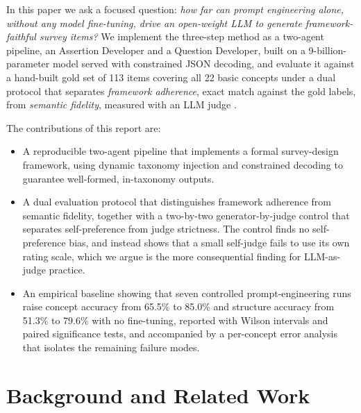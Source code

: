 \documentclass[onecolumn, 11pt]{IEEEtran}
\begin{document}
In this paper we ask a focused question: \emph{how far can prompt engineering alone, without any model fine-tuning, drive an open-weight LLM to generate framework-faithful survey items?} We implement the three-step method as a two-agent pipeline, an Assertion Developer and a Question Developer, built on a 9-billion-parameter model served with constrained JSON decoding, and evaluate it against a hand-built gold set of 113 items covering all 22 basic concepts under a dual protocol that separates \emph{framework adherence}, exact match against the gold labels, from \emph{semantic fidelity}, measured with an LLM judge \cite{zheng2023judging}.

The contributions of this report are:
\begin{itemize}
\item A reproducible two-agent pipeline that implements a formal survey-design framework, using dynamic taxonomy injection and constrained decoding to guarantee well-formed, in-taxonomy outputs.
\item A dual evaluation protocol that distinguishes framework adherence from semantic fidelity, together with a two-by-two generator-by-judge control that separates self-preference from judge strictness. The control finds no self-preference bias, and instead shows that a small self-judge fails to use its own rating scale, which we argue is the more consequential finding for LLM-as-judge practice.
\item An empirical baseline showing that seven controlled prompt-engineering runs raise concept accuracy from 65.5\% to 85.0\% and structure accuracy from 51.3\% to 79.6\% with no fine-tuning, reported with Wilson intervals and paired significance tests, and accompanied by a per-concept error analysis that isolates the remaining failure modes.
\end{itemize}


\section{Background and Related Work}
\label{sec:related}
\end{document}

